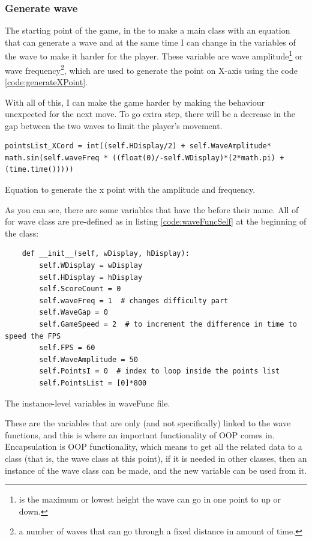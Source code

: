 \subsubsection{Generate wave}


The starting point of the game, in the  to make a main class  with an equation that can generate a wave and at the same time I can change in the variables of the wave to make it harder for the player. These variable are wave amplitude\footnote{is the maximum or lowest height the wave can go in one point to up or down.} or wave frequency\footnote{a number of waves that can go through a fixed distance in amount of time.}, which are used to generate the point on X-axis using the code \ref{code:generateXPoint}.

With all of this, I can make the game harder by making the behaviour unexpected for the next move. To go extra step, there will be a decrease in the gap between the two waves to limit the player's movement.

\begin{listing}[H]
\begin{verbatim}
pointsList_XCord = int((self.HDisplay/2) + self.WaveAmplitude* math.sin(self.waveFreq * ((float(0)/-self.WDisplay)*(2*math.pi) + (time.time()))))
\end{verbatim}
\caption{Equation to generate the x point with the amplitude and frequency.}
\label{code:generateXPoint}
\end{listing}
As you can see, there are some variables that have the  before their name. All of  for wave class are pre-defined as in listing \ref{code:waveFuncSelf} at the beginning of the class:

\begin{listing}[H]
\begin{verbatim}
	def __init__(self, wDisplay, hDisplay):
		self.WDisplay = wDisplay
		self.HDisplay = hDisplay
		self.ScoreCount = 0  
		self.waveFreq = 1  # changes difficulty part
		self.WaveGap = 0
		self.GameSpeed = 2  # to increment the difference in time to speed the FPS
		self.FPS = 60
		self.WaveAmplitude = 50
		self.PointsI = 0  # index to loop inside the points list
		self.PointsList = [0]*800
\end{verbatim}
\caption{The instance-level variables in waveFunc file.}
\label{code:waveFuncSelf}
\end{listing}


These are the variables that are only (and not specifically) linked to the wave functions, and this is where an important functionality of OOP comes in. Encapsulation is OOP functionality, which means to get all the related data to a class (that is, the wave class at this point), if it is needed in other classes, then an instance of the wave class can be made, and the new variable can be used from it.

